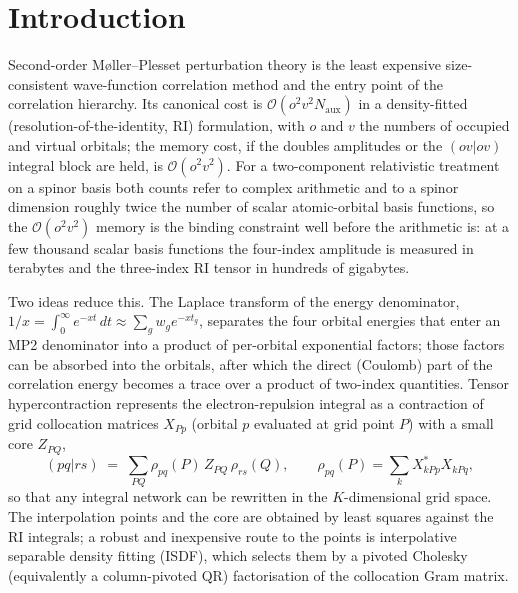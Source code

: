 \documentclass[aip,jcp,amsmath,amssymb,preprint,superscriptaddress]{revtex4-2}%
\newcommand{\Naux}{N_{\mathrm{aux}}}
\newcommand{\Ord}[1]{\mathcal{O}\!\left(#1\right)}
\begin{document}
\maketitle

\section{Introduction}

Second-order M{\o}ller--Plesset perturbation theory is the least expensive
size-consistent wave-function correlation method and the entry point of the
correlation hierarchy. Its canonical cost is $\Ord{o^2v^2\Naux}$ in a
density-fitted (resolution-of-the-identity, RI) formulation,\cite{Whitten1973,
Dunlap1979,Vahtras1993,Feyereisen1993} with $o$ and $v$ the numbers of
occupied and virtual orbitals; the memory cost, if the doubles amplitudes or
the $(ov|ov)$ integral block are held, is $\Ord{o^2v^2}$. For a
two-component relativistic treatment on a spinor basis both counts refer to
complex arithmetic and to a spinor dimension roughly twice the number of
scalar atomic-orbital basis functions, so the $\Ord{o^2v^2}$ memory is the
binding constraint well before the arithmetic is: at a few thousand scalar
basis functions the four-index amplitude is measured in terabytes and the
three-index RI tensor in hundreds of gigabytes.

Two ideas reduce this. The Laplace transform of the energy
denominator,\cite{Almlof1991,Haser1992,Haser1993} $1/x=\int_0^\infty
e^{-xt}\,dt \approx \sum_g w_g e^{-x t_g}$, separates the four orbital
energies that enter an MP2 denominator into a product of per-orbital
exponential factors; those factors can be absorbed into the orbitals, after
which the direct (Coulomb) part of the correlation energy becomes a trace
over a product of two-index quantities.\cite{Jung2004,Nakajima2006} Tensor
hypercontraction\cite{Hohenstein2012,Parrish2012,Hohenstein2012b} represents
the electron-repulsion integral as a contraction of grid collocation
matrices $X_{Pp}$ (orbital $p$ evaluated at grid point $P$) with a small
core $Z_{PQ}$,
\begin{equation}
  (pq|rs) \;=\; \sum_{PQ}\rho_{pq}(P)\,Z_{PQ}\,\rho_{rs}(Q),
  \qquad
  \rho_{pq}(P)=\sum_{k}X^{*}_{kPp}X_{kPq},
  \label{eq:thc}
\end{equation}
so that any integral network can be rewritten in the $K$-dimensional grid
space. The interpolation points and the core are obtained by least squares
against the RI integrals; a robust and inexpensive route to the points is
interpolative separable density fitting (ISDF),\cite{Lu2015,Hu2017} which
selects them by a pivoted Cholesky (equivalently a column-pivoted QR)
factorisation of the collocation Gram matrix.
\end{document}
